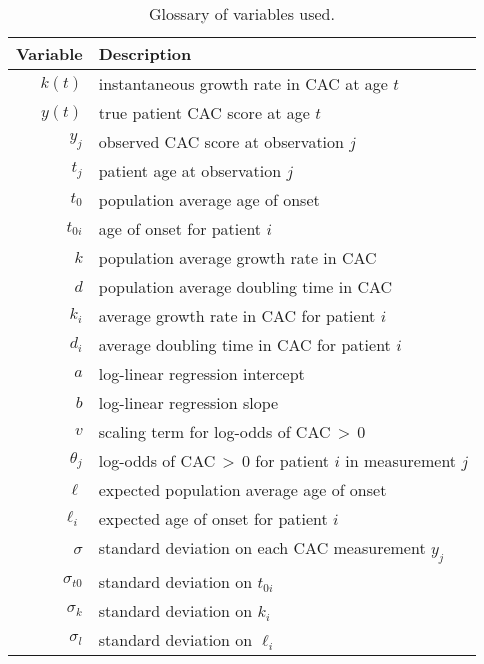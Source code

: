 \documentclass[aps,pre,twocolumn,twoside,tightenlines,groupedaddress,amsmath,amssymb,nobibnotes,final,showkeys,letterpaper]{revtex4-2}
\begin{document}
\begin{table}[h]
  \centering
  \begin{tabular}{rl}
    \toprule
    Variable     & Description  \\
    \midrule
    $k(t)$     & instantaneous growth rate in CAC at age $t$ \\
    $y(t)$     & true patient CAC score at age $t$ \\
    $y_j$     & observed CAC score at observation $j$ \\
    $t_j$     & patient age at observation $j$  \\
    $t_0$     & population average age of onset  \\
    $t_{0i}$     & age of onset for patient $i$ \\
    $k$     & population average growth rate in CAC \\
    $d$     & population average doubling time in CAC \\
    $k_i$     & average growth rate in CAC for patient $i$ \\
    $d_i$     & average doubling time in CAC for patient $i$ \\
    $a$     & log-linear regression intercept \\
    $b$     & log-linear regression slope \\
    $v$     & scaling term for log-odds of CAC\,$>$\,0 \\
    $\theta_j$     & log-odds of CAC\,$>$\,0 for patient $i$ in measurement $j$ \\
    $\ell$ & expected population average age of onset \\
    $\ell_i$     & expected age of onset for patient $i$ \\
    $\sigma$     & standard deviation on each CAC measurement $y_j$ \\
    $\sigma_{t0}$     & standard deviation on $t_{0i}$ \\
    $\sigma_{k}$     & standard deviation on $k_{i}$ \\
    $\sigma_{l}$     & standard deviation on $\ell_{i}$ \\
    \bottomrule
  \end{tabular}
  \caption{Glossary of variables used.}
  \label{tab:variableGlossary}
\end{table}
\end{document}
